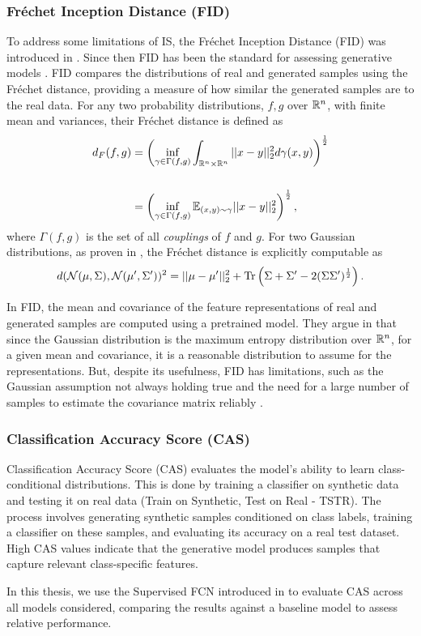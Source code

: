 \documentclass[../../thesis.tex]{subfiles}
\begin{document}
\subsubsection{Fréchet Inception Distance (FID)}
To address some limitations of IS, the Fréchet Inception Distance (FID) was introduced in \cite{heusel2018gans}. Since then FID has been the standard for assessing generative models \cite{borji2021pros}. FID compares the distributions of real and generated samples using the Fréchet distance, providing a measure of how similar the generated samples are to the real data. For any two probability distributions, $f,g$ over $\mathbb{R}^n$, with finite mean and variances, their Fréchet distance is defined as 
\begin{equation}
    \begin{aligned}
        d_F(f,g) &= \left(\inf_{\gamma \in \Gamma(f,g)} \int_{\mathbb{R}^n\times\mathbb{R}^n}||x-y||_2^2d\gamma(x,y) \right)^{\frac{1}{2}}\\\\
            &= \left(\inf_{\gamma \in \Gamma(f,g)} \mathbb{E}_{(x,y)\sim \gamma} ||x-y||_2^2\right)^{\frac{1}{2}},
    \end{aligned}
\end{equation}
where $\Gamma(f,g)$ is the set of all \textit{couplings} of $f$ and $g$. For two Gaussian distributions, as proven in  \cite{DOWSON1982450}, the Fréchet distance is explicitly computable as
\begin{equation}
    \label{eq:FID Gaussian}
    d(\mathcal{N}(\mu,\Sigma),\mathcal{N}(\mu',\Sigma'))^2 = ||\mu-\mu'||_2^2 + \operatorname{Tr} \left( \Sigma + \Sigma' - 2(\Sigma\Sigma')^{\frac12}\right).
\end{equation}

In FID, the mean and covariance of the feature representations of real and generated samples are computed using a pretrained model. They argue in \cite{heusel2018gans} that since the Gaussian distribution is the maximum entropy distribution over $\mathbb{R}^n$, for a given mean and covariance, it is a reasonable distribution to assume for the representations. But, despite its usefulness, FID has limitations, such as the Gaussian assumption not always holding true and the need for a large number of samples to estimate the covariance matrix reliably \cite{jayasumana2024rethinking, chong2020effectively}.

\subsubsection{Classification Accuracy Score (CAS)}
Classification Accuracy Score (CAS) evaluates the model's ability to learn class-conditional distributions. This is done by training a classifier on synthetic data and testing it on real data (Train on Synthetic, Test on Real - TSTR). The process involves generating synthetic samples conditioned on class labels, training a classifier on these samples, and evaluating its accuracy on a real test dataset. High CAS values indicate that the generative model produces samples that capture relevant class-specific features.\newline

In this thesis, we use the Supervised FCN introduced in \cite{TimeVQVAE} to evaluate CAS across all models considered, comparing the results against a baseline model to assess relative performance.
\end{document}
